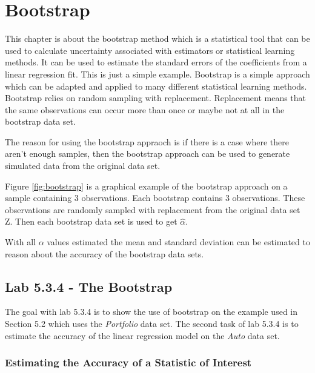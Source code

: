 \chapter{Bootstrap}
\label{chp:boots}

This chapter is about the bootstrap method which is a statistical tool that can be used to calculate uncertainty associated with estimators or statistical learning methods. It can be used to estimate the standard errors of the coefficients from a linear regression fit. This is just a simple example. Bootstrap is a simple approach which can be adapted and applied to many different statistical learning methods. Bootstrap relies on random sampling with replacement. Replacement means that the same observations can occur more than once or maybe not at all in the bootstrap data set. 

The reason for using the bootstrap appraoch is if there is a case where there aren't enough samples, then the bootstrap approach can be used to generate simulated data from the original data set.

 

Figure \ref{fig:bootstrap} is a graphical example of the bootstrap approach on a sample containing 3 observations. Each bootstrap contains 3 observations. These observations are randomly sampled with replacement from the original data set Z. Then each bootstrap data set is used to get $\hat{\alpha}$.

With all $\alpha$ values estimated the mean and standard deviation can be estimated to reason about the accuracy of the bootstrap data sets.

\section{Lab 5.3.4 - The Bootstrap}

The goal with lab 5.3.4 is to show the use of bootstrap on the example used in Section 5.2\citep{ISLR} which uses the \emph{Portfolio} data set. The second task of lab 5.3.4 is to estimate the accuracy of the linear regression model on the \emph{Auto} data set.

\subsection{Estimating the Accuracy of a Statistic of Interest}

